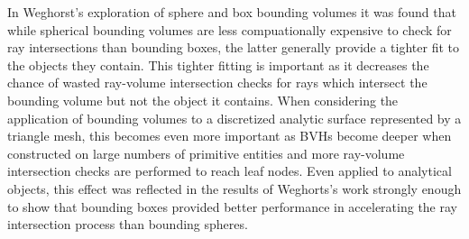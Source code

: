 \documentclass[12pt, a4paper]{article}
\begin{document}
In Weghorst's exploration of sphere and box bounding volumes it was found that while spherical bounding volumes are less compuationally expensive to check for ray intersections than bounding boxes, the latter generally provide a tighter fit to the objects they contain. This tighter fitting is important as it decreases the chance of wasted ray-volume intersection checks for rays which intersect the bounding volume but not the object it contains. When considering the application of bounding volumes to a discretized analytic surface represented by a triangle mesh, this becomes even more important as BVHs become deeper when constructed on large numbers of primitive entities and more ray-volume intersection checks are performed to reach leaf nodes. Even applied to analytical objects, this effect was reflected in the results of Weghorts's work strongly enough to show that bounding boxes provided better performance in accelerating the ray intersection process than bounding spheres.
\end{document}
